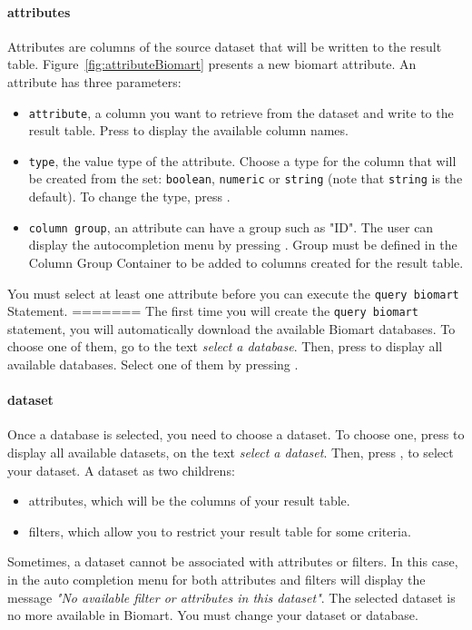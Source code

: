 \begin{itemize}
\paragraph{attributes}
Attributes are columns of the source dataset that will be written to the result table. Figure~\ref{fig:attributeBiomart} presents a new biomart attribute. An attribute has three parameters:
\begin{itemize}

\item \texttt{attribute}, a column you want to retrieve from the dataset and write to the result table. Press \keys{\ctrl+\space} to display the available column names.
\item \texttt{type}, the value type of the attribute. Choose a type for the column that will be created from the set: \texttt{boolean}, \texttt{numeric} or \texttt{string} (note that \texttt{string} is the default). To change the type, press \keys{\ctrl+\space}.
\item \texttt{column group}, an attribute can have a group such as "ID". The user can display the autocompletion menu by pressing \keys{\ctrl+\space}. Group must be defined in the Column Group Container to be added to columns created for the result table.
\end{itemize}

\begin{remark}
You must select at least one attribute before you can execute the \texttt{query biomart} Statement.
=======
The first time you will create the \texttt{query biomart} statement, you will automatically download the available Biomart databases. To choose one of them, go to the text \textit{select a database}. Then, press \keys{\ctrl+\space} to display all available databases. Select one of them by pressing \keys{\return}. 


 \paragraph{dataset} 
Once a database is selected, you need to choose a dataset. To choose one, press \keys{\ctrl+\space} to display all available datasets, on the text \textit{select a dataset}. Then, press \keys{\return}, to select your dataset. \newline
A dataset as two childrens:
\begin{itemize}
\item attributes, which will be the columns of your result table.
\item filters, which allow you to restrict your result table for some criteria.
\end{itemize}
\begin{remark}
Sometimes, a dataset cannot be associated with attributes or filters. In this case, in the auto completion menu for both attributes and filters will display the message \textit{"No available filter or attributes in this dataset"}. The selected dataset is no more available in Biomart. You must change your dataset or database. 
\end{remark}


\end{remark}
\end{itemize}
